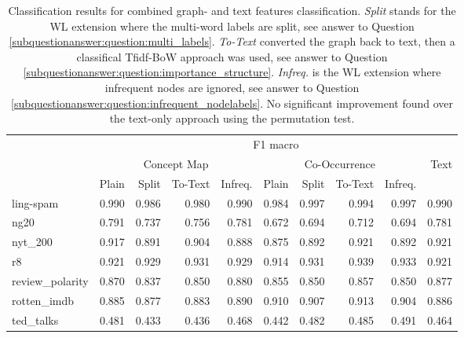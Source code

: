 \begin{table}[htb!]
\centering
\begin{tabular}{lrrrr|rrrr|r}
	\toprule
	{} & \multicolumn{9}{c}{F1 macro} \\
	{} & \multicolumn{4}{c|}{Concept Map} & \multicolumn{4}{c|}{Co-Occurrence} &  Text \\
	&     Plain & Split & To-Text & Infreq. & Plain & Split & To-Text & Infreq. &  \\
	\midrule
ling-spam       & 0.990 & 0.986 & 0.980 & 0.990 & 0.984 & 0.997 & 0.994 & 0.997 & 0.990 \\
ng20            & 0.791 & 0.737 & 0.756 & 0.781 & 0.672 & 0.694 & 0.712 & 0.694 & 0.781 \\
nyt\_200         & 0.917 & 0.891 & 0.904 & 0.888 & 0.875 & 0.892 & 0.921 & 0.892 & 0.921 \\
r8              & 0.921 & 0.929 & 0.931 & 0.929 & 0.914 & 0.931 & 0.939 & 0.933 & 0.921 \\
review\_polarity & 0.870 & 0.837 & 0.850 & 0.880 & 0.855 & 0.850 & 0.857 & 0.850 & 0.877 \\
rotten\_imdb     & 0.885 & 0.877 & 0.883 & 0.890 & 0.910 & 0.907 & 0.913 & 0.904 & 0.886 \\
ted\_talks       & 0.481 & 0.433 & 0.436 & 0.468 & 0.442 & 0.482 & 0.485 & 0.491 & 0.464 \\
	\bottomrule
\end{tabular}

\caption[Results: Combined text- and graph features]{Classification results for combined graph- and text features classification.
\textit{Split} stands for the WL extension where the multi-word labels are split, see answer to Question \ref{subquestionanswer:question:multi_labels}.
\textit{To-Text} converted the graph back to text, then a classifical Tfidf-BoW approach was used, see answer to Question \ref{subquestionanswer:question:importance_structure}.
\textit{Infreq.} is the WL extension where infrequent nodes are ignored, see answer to Question \ref{subquestionanswer:question:infrequent_nodelabels}.
No significant improvement found over the text-only approach using the permutation test.
}%
\label{table:results_comparison_combined}
\end{table}


